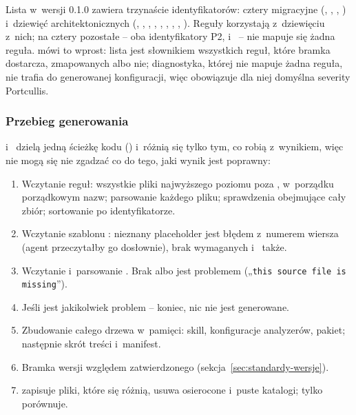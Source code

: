 Lista  w~wersji 0.1.0 zawiera trzynaście identyfikatorów: cztery
migracyjne (, ,
, ) i~dziewięć
architektonicznych (,
, ,
, ,
, ,
, ).
Reguły korzystają z~dziewięciu z~nich; na cztery pozostałe -- oba identyfikatory P2,
 i~ -- nie
mapuje się żadna reguła.  mówi to wprost: lista jest słownikiem
wszystkich reguł, które bramka dostarcza, zmapowanych albo nie; diagnostyka, której nie
mapuje żadna reguła, nie trafia do generowanej konfiguracji, więc obowiązuje dla niej
domyślna severity Portcullis.

\subsubsection{Przebieg generowania}

 i~ dzielą jedną ścieżkę kodu
() i~różnią się tylko tym, co robią z~wynikiem, więc nie mogą
się nie zgadzać co do tego, jaki wynik jest poprawny:

\begin{enumerate}
  \item Wczytanie reguł: wszystkie pliki  najwyższego poziomu poza
        , w~porządku porządkowym nazw; parsowanie każdego pliku; sprawdzenia
        obejmujące cały zbiór; sortowanie po identyfikatorze.
  \item Wczytanie szablonu : nieznany placeholder jest
        błędem z~numerem wiersza (agent przeczytałby go dosłownie), brak wymaganych
         i~ także.
  \item Wczytanie i~parsowanie . Brak 
        albo  jest problemem („\texttt{this source file is missing}”).
  \item Jeśli jest jakikolwiek problem -- koniec, nic nie jest generowane.
  \item Zbudowanie całego drzewa w~pamięci: skill, konfiguracje analyzerów, pakiet; następnie
        skrót treści i~manifest.
  \item Bramka wersji względem zatwierdzonego 
        (sekcja~\ref{sec:standardy-wersje}).
  \item {} zapisuje pliki, które się różnią, usuwa osierocone i~puste
        katalogi;  tylko porównuje.
\end{enumerate}

